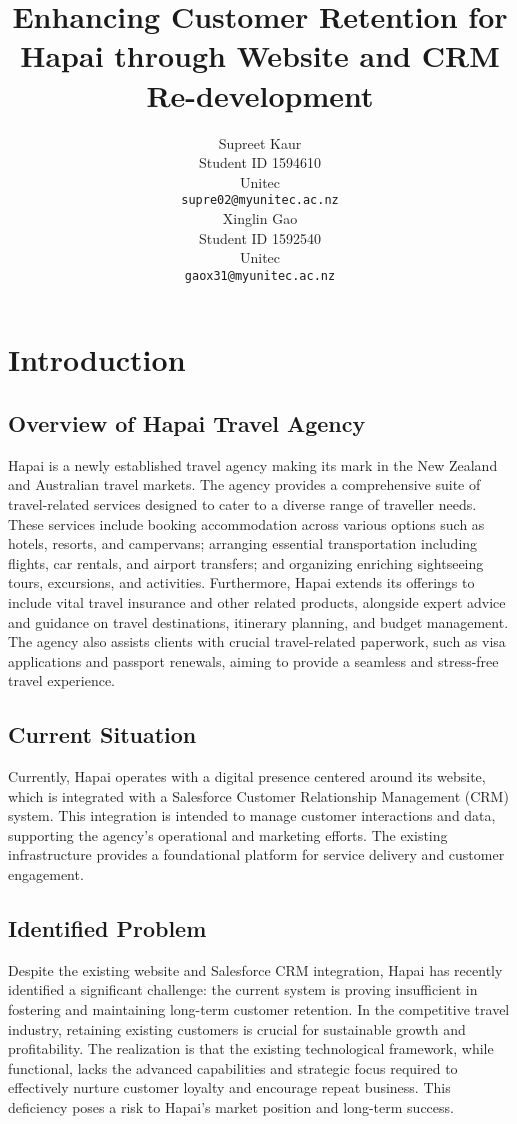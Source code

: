 \documentclass{article}
\title{Enhancing Customer Retention for Hapai through Website and CRM Re-development
}
\author{
  Supreet Kaur \\
  Student ID 1594610 \\
  Unitec \\
  \texttt{supre02@myunitec.ac.nz} \\
   \And
  Xinglin Gao \\
  Student ID 1592540 \\
  Unitec \\
  \texttt{gaox31@myunitec.ac.nz} \\
}
\begin{document}
\maketitle


\begin{abstract}
\lipsum[1]
\end{abstract}




\section{Introduction}
\subsection{Overview of Hapai Travel Agency}
Hapai is a newly established travel agency making its mark in the New Zealand and Australian travel markets. The agency provides a comprehensive suite of travel-related services designed to cater to a diverse range of traveller needs. These services include booking accommodation across various options such as hotels, resorts, and campervans; arranging essential transportation including flights, car rentals, and airport transfers; and organizing enriching sightseeing tours, excursions, and activities. Furthermore, Hapai extends its offerings to include vital travel insurance and other related products, alongside expert advice and guidance on travel destinations, itinerary planning, and budget management. The agency also assists clients with crucial travel-related paperwork, such as visa applications and passport renewals, aiming to provide a seamless and stress-free travel experience.

\subsection{Current Situation}
Currently, Hapai operates with a digital presence centered around its website, which is integrated with a Salesforce Customer Relationship Management (CRM) system. This integration is intended to manage customer interactions and data, supporting the agency's operational and marketing efforts. The existing infrastructure provides a foundational platform for service delivery and customer engagement.

\subsection{Identified Problem}
Despite the existing website and Salesforce CRM integration, Hapai has recently identified a significant challenge: the current system is proving insufficient in fostering and maintaining long-term customer retention. In the competitive travel industry, retaining existing customers is crucial for sustainable growth and profitability. The realization is that the existing technological framework, while functional, lacks the advanced capabilities and strategic focus required to effectively nurture customer loyalty and encourage repeat business. This deficiency poses a risk to Hapai's market position and long-term success.
\end{document}
